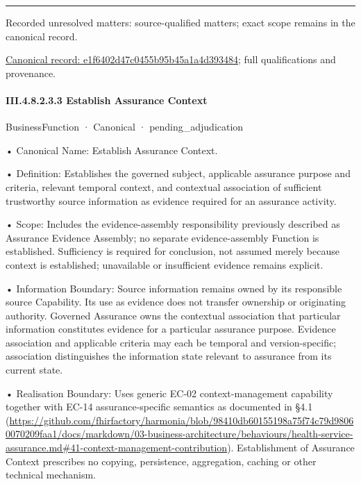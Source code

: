 \medskip\hrule\medskip

{\small Recorded unresolved matters: source-qualified matters; exact scope remains in the canonical record.}\par
{\footnotesize \href{../../../../../../../../continuum/business/business-function/e1f6402d47c0455b95b45a1a4d393484.md}{Canonical record: e1f6402d47c0455b95b45a1a4d393484}; full qualifications and provenance.}\par
\paragraph*{III.4.8.2.3.3 Establish Assurance Context}
\label{navigation:III.4.8.2.3.3}

\label{element:ffffe352e28c4e878d986b0e15ddff15}
{\small BusinessFunction · Canonical · pending\_adjudication}\par

•
Canonical Name: Establish Assurance Context.



•
Definition: Establishes the governed subject, applicable assurance purpose and criteria, relevant temporal context, and contextual association of sufficient trustworthy source information as evidence required for an assurance activity.



•
Scope: Includes the evidence-assembly responsibility previously described as Assurance Evidence Assembly; no separate evidence-assembly Function is established. Sufficiency is required for conclusion, not assumed merely because context is established; unavailable or insufficient evidence remains explicit.



•
Information Boundary: Source information remains owned by its responsible source Capability. Its use as evidence does not transfer ownership or originating authority. Governed Assurance owns the contextual association that particular information constitutes evidence for a particular assurance purpose. Evidence association and applicable criteria may each be temporal and version-specific; association distinguishes the information state relevant to assurance from its current state.



•
Realisation Boundary: Uses generic EC-02 context-management capability together with EC-14 assurance-specific semantics as documented in §4.1 (\url{https://github.com/fhirfactory/harmonia/blob/98410db60155198a75f74c79d98060070209faa1/docs/markdown/03-business-architecture/behaviours/health-service-assurance.md#41-context-management-contribution}). Establishment of Assurance Context prescribes no copying, persistence, aggregation, caching or other technical mechanism.




